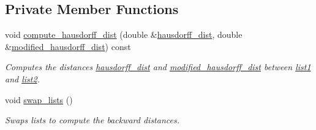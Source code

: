 \subsection*{Private Member Functions}
\begin{DoxyCompactItemize}
\item 
\hypertarget{classofeli_1_1_hausdorff_distance_a60cd38cf5ac504a49fdae5aa8c1f5daa}{void \hyperlink{classofeli_1_1_hausdorff_distance_a60cd38cf5ac504a49fdae5aa8c1f5daa}{compute\-\_\-hausdorff\-\_\-dist} (double \&\hyperlink{classofeli_1_1_hausdorff_distance_a895012cca75a4f37ff0ef376dca57581}{hausdorff\-\_\-dist}, double \&\hyperlink{classofeli_1_1_hausdorff_distance_aa567ae532fb26c06648463ed3e0db0c6}{modified\-\_\-hausdorff\-\_\-dist}) const }\label{classofeli_1_1_hausdorff_distance_a60cd38cf5ac504a49fdae5aa8c1f5daa}

\begin{DoxyCompactList}\small\item\em Computes the distances \hyperlink{classofeli_1_1_hausdorff_distance_a895012cca75a4f37ff0ef376dca57581}{hausdorff\-\_\-dist} and \hyperlink{classofeli_1_1_hausdorff_distance_aa567ae532fb26c06648463ed3e0db0c6}{modified\-\_\-hausdorff\-\_\-dist} between \hyperlink{classofeli_1_1_hausdorff_distance_a363ef19e82b2743e828ec0a613b81a1d}{list1} and \hyperlink{classofeli_1_1_hausdorff_distance_a214f70f274ec1099b0b3fda1e5060c1f}{list2}. \end{DoxyCompactList}\item 
\hypertarget{classofeli_1_1_hausdorff_distance_a86ce0a178063d6d80c5c4d8dd89bf7c0}{void \hyperlink{classofeli_1_1_hausdorff_distance_a86ce0a178063d6d80c5c4d8dd89bf7c0}{swap\-\_\-lists} ()}\label{classofeli_1_1_hausdorff_distance_a86ce0a178063d6d80c5c4d8dd89bf7c0}

\begin{DoxyCompactList}\small\item\em Swaps lists to compute the backward distances. \end{DoxyCompactList}\end{DoxyCompactItemize}
